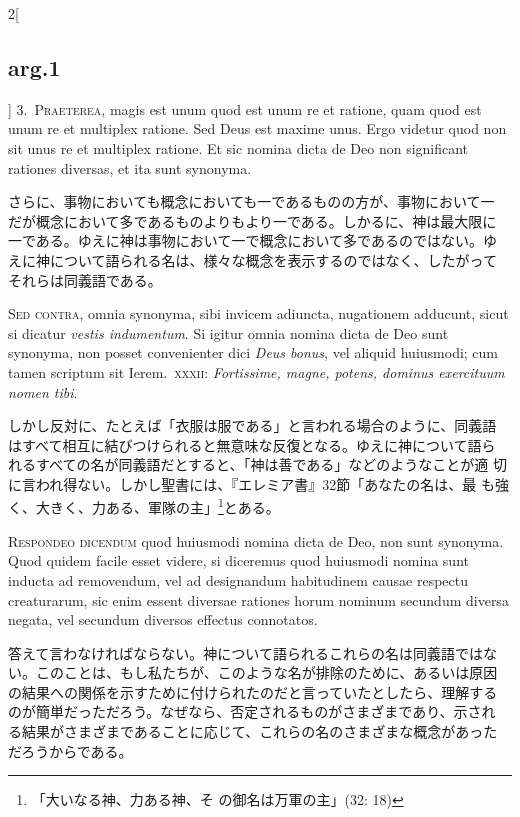 \documentclass[paper=a4paper,fontsize=10pt,jafontsize=9pt,titlepage]{jlreq}
\begin{document}
\begin{paracol}{2}[\subsection{arg.1}]
3.~{\scshape Praeterea}, magis est unum quod est unum re et ratione, quam
quod est unum re et multiplex ratione. Sed Deus est maxime unus. Ergo
videtur quod non sit unus re et multiplex ratione. Et sic nomina dicta
de Deo non significant rationes diversas, et ita sunt synonyma.

\switchcolumn

さらに、事物においても概念においても一であるものの方が、事物において一
だが概念において多であるものよりもより一である。しかるに、神は最大限に
一である。ゆえに神は事物において一で概念において多であるのではない。ゆ
えに神について語られる名は、様々な概念を表示するのではなく、したがって
それらは同義語である。

\switchcolumn*[\subsection{s.c.}]

{\scshape Sed contra}, omnia synonyma, sibi invicem adiuncta, nugationem
adducunt, sicut si dicatur {\itshape vestis indumentum}. Si igitur omnia
nomina dicta de Deo sunt synonyma, non posset convenienter dici {\itshape
Deus bonus}, vel aliquid huiusmodi; cum tamen scriptum sit Ierem.\
{\scshape xxxii}: {\itshape Fortissime, magne, potens, dominus exercituum nomen
tibi}.

\switchcolumn

しかし反対に、たとえば「衣服は服である」と言われる場合のように、同義語
はすべて相互に結びつけられると無意味な反復となる。ゆえに神について語ら
れるすべての名が同義語だとすると、「神は善である」などのようなことが適
切に言われ得ない。しかし聖書には、『エレミア書』32節「あなたの名は、最
も強く、大きく、力ある、軍隊の主」\footnote{「大いなる神、力ある神、そ
の御名は万軍の主」(32: 18)}とある。


{\scshape Respondeo dicendum} quod huiusmodi nomina dicta de Deo, non sunt
synonyma. Quod quidem facile esset videre, si diceremus quod huiusmodi
nomina sunt inducta ad removendum, vel ad designandum habitudinem
causae respectu creaturarum, sic enim essent diversae rationes horum
nominum secundum diversa negata, vel secundum diversos effectus
connotatos.

\switchcolumn

答えて言わなければならない。神について語られるこれらの名は同義語ではな
い。このことは、もし私たちが、このような名が排除のために、あるいは原因
の結果への関係を示すために付けられたのだと言っていたとしたら、理解する
のが簡単だっただろう。なぜなら、否定されるものがさまざまであり、示され
る結果がさまざまであることに応じて、これらの名のさまざまな概念があった
だろうからである。


\end{paracol}
\end{document}
